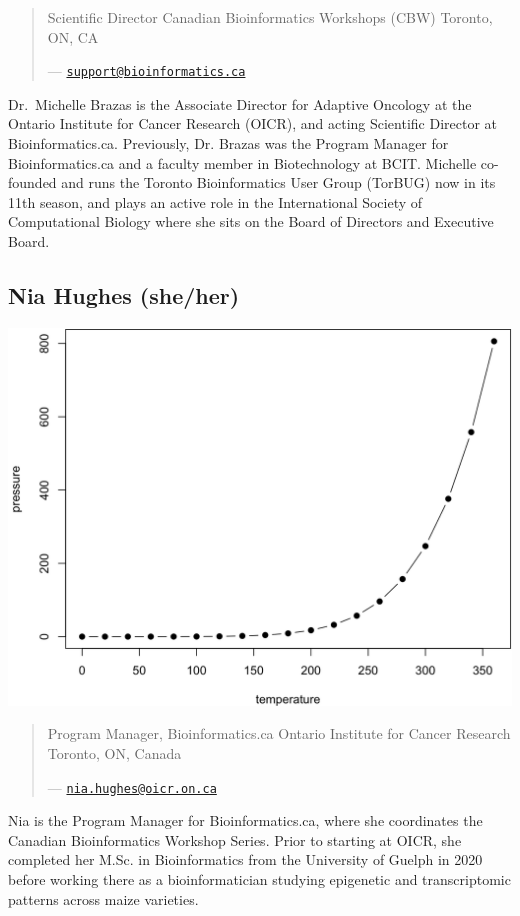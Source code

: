 \documentclass[
]{book}
\theoremstyle{definition}
\theoremstyle{definition}
\theoremstyle{definition}
\theoremstyle{definition}
\theoremstyle{remark}
\begin{document}
\begin{quote}
Scientific Director
Canadian Bioinformatics Workshops (CBW)
Toronto, ON, CA

--- \href{mailto:support@bioinformatics.ca}{\nolinkurl{support@bioinformatics.ca}}
\end{quote}

Dr.~Michelle Brazas is the Associate Director for Adaptive Oncology at the Ontario Institute for
Cancer Research (OICR), and acting Scientific Director at Bioinformatics.ca. Previously, Dr.
Brazas was the Program Manager for Bioinformatics.ca and a faculty member in
Biotechnology at BCIT. Michelle co-founded and runs the Toronto Bioinformatics User Group
(TorBUG) now in its 11th season, and plays an active role in the International Society of
Computational Biology where she sits on the Board of Directors and Executive Board.

\subsection*{\texorpdfstring{Nia Hughes (she/her) }{Nia Hughes  (she/her) }}\label{nia-hughes-sheher}

\begin{center}\includegraphics[width=0.65\linewidth]{./_main_files/figure-html/nice-fig-1} \end{center}

\begin{quote}
Program Manager, Bioinformatics.ca
Ontario Institute for Cancer Research
Toronto, ON, Canada

--- \href{mailto:nia.hughes@oicr.on.ca}{\nolinkurl{nia.hughes@oicr.on.ca}}
\end{quote}

Nia is the Program Manager for Bioinformatics.ca, where she coordinates the Canadian
Bioinformatics Workshop Series. Prior to starting at OICR, she completed her M.Sc. in
Bioinformatics from the University of Guelph in 2020 before working there as a
bioinformatician studying epigenetic and transcriptomic patterns across maize varieties.
\end{document}
